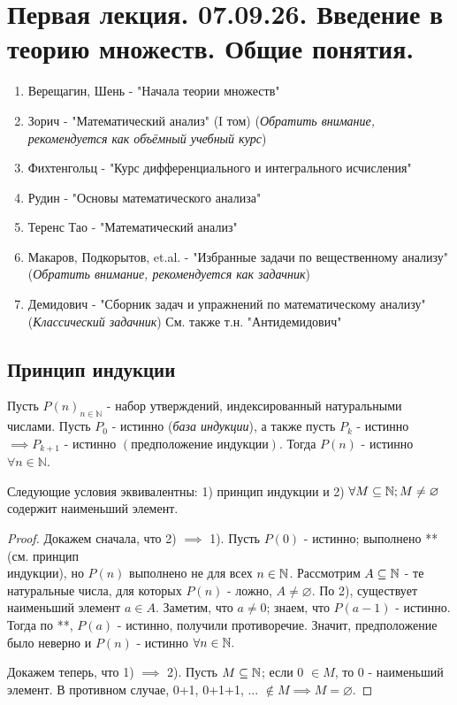 \newpage
	
\section{Первая лекция. 07.09.26. Введение в теорию множеств. Общие понятия.}
\begin{enumerate}
	\item Верещагин, Шень - "Начала теории множеств"
	\item Зорич - "Математический анализ" (I том) (\textit{Обратить внимание, рекомендуется как объёмный учебный курс})
	\item Фихтенгольц - "Курс дифференциального и интегрального исчисления"
	\item Рудин - "Основы математического анализа"
	\item Теренс Тао - "Математический анализ"
	\item Макаров, Подкорытов, et.al. - "Избранные задачи по вещественному анализу" (\textit{Обратить внимание, рекомендуется как задачник})
	\item Демидович - "Сборник задач и упражнений по математическому анализу" (\textit{Классический задачник}) См. также т.н. "Антидемидович"
\end{enumerate}
	
\subsection{Принцип индукции}
Пусть $P(n)_{n\in \mathbb{N}}$ - набор утверждений, индексированный натуральными числами. Пусть $P_0$ - истинно (\textit{база
индукции}), а также пусть $P_k$ - истинно $\implies P_{k+1}$ - истинно $(\textit{предположение индукции})$. Тогда $P(n)$ - истинно $\forall n \in\mathbb{N}$.

\begin{proposition}
	Следующие условия эквивалентны: 1) принцип индукции и 2) $ \forall M \subseteq \mathbb{N}; M \neq \varnothing$ содержит наименьший элемент.
\end{proposition}

\begin{proof}
	Докажем сначала, что 2) $\implies$ 1). Пусть $P(0)$  - истинно; выполнено ** (см. принцип \\ индукции), но $P(n)$ выполнено не для всех $n \in \mathbb{N}$. Рассмотрим $A \subseteq \mathbb{N}$ - те натуральные числа, для которых $P(n)$ - ложно, $A \neq \varnothing.$
	По 2), существует наименьший элемент $a \in A.$ Заметим, что $a \neq 0$; знаем, что $P(a-1)$ - истинно. Тогда по **, $P(a)$ - истинно, получили противоречие. Значит, предположение было неверно и $P(n)$ - истинно $\forall n \in \mathbb{N}. $
	
	Докажем теперь, что 1) $\implies$ 2). Пусть $M \subseteq \mathbb{N}$; если 0 $\in M$, то 0 - наименьший элемент. В противном случае, 0+1, 0+1+1, ... $\notin M \implies M = \varnothing.$
\end{proof}

